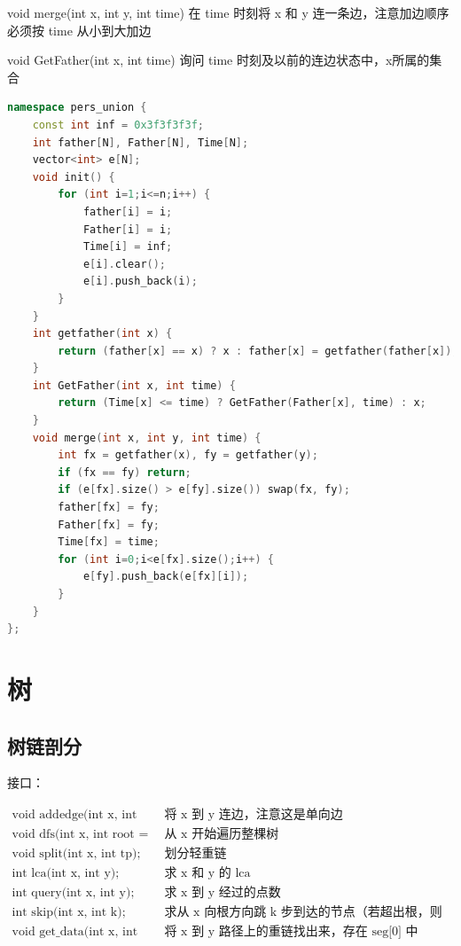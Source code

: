 \documentclass{article}
\begin{document}
void merge(int x, int y, int time) 在 time 时刻将 x 和 y 连一条边，注意加边顺序必须按 time 从小到大加边

void GetFather(int x, int time) 询问 time 时刻及以前的连边状态中，x所属的集合
\begin{lstlisting}[language=C++]
namespace pers_union {
	const int inf = 0x3f3f3f3f;
	int father[N], Father[N], Time[N];
	vector<int> e[N];
	void init() {
		for (int i=1;i<=n;i++) {
			father[i] = i;
			Father[i] = i;
			Time[i] = inf;
			e[i].clear();
			e[i].push_back(i);
		}
	}
	int getfather(int x) {
		return (father[x] == x) ? x : father[x] = getfather(father[x]);
	}
	int GetFather(int x, int time) {
		return (Time[x] <= time) ? GetFather(Father[x], time) : x;
	}
	void merge(int x, int y, int time) {
		int fx = getfather(x), fy = getfather(y);
		if (fx == fy) return;
		if (e[fx].size() > e[fy].size()) swap(fx, fy);
		father[fx] = fy;
		Father[fx] = fy;
		Time[fx] = time;
		for (int i=0;i<e[fx].size();i++) {
			e[fy].push_back(e[fx][i]);
		}
	}
};
\end{lstlisting}

\section{树}

\subsection{树链剖分}

接口：

$
\begin{array}{ll}
	\text{void addedge(int x, int y);} & \text{将 x 到 y 连边，注意这是单向边} \\
	\text{void dfs(int x, int root = 0);} & \text{从 x 开始遍历整棵树} \\
	\text{void split(int x, int tp);} & \text{划分轻重链} \\
	\text{int lca(int x, int y);} & \text{求 x 和 y 的 lca} \\
	\text{int query(int x, int y);} & \text{求 x 到 y 经过的点数} \\
	\text{int skip(int x, int k);} & \text{求从 x 向根方向跳 k 步到达的节点（若超出根，则返回 0）} \\
	\text{void get\_data(int x, int y);} & \text{将 x 到 y 路径上的重链找出来，存在 seg[0] 中} \\
	
\end{array}
$
\end{document}
